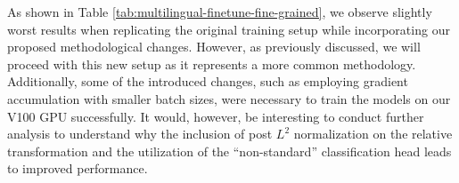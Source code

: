 \documentclass[../main.tex]{subfiles}
\begin{document}
\begin{table}[h]
\centering
{}
\caption{Summary of the original results presented in \cite{moschella_relative_2022} (over five random seeds)}
\label{tab:multilingual-finetune-og}
\end{table}

As shown in Table \ref{tab:multilingual-finetune-fine-grained}, we observe slightly worst results when replicating the original training setup while incorporating our proposed methodological changes. However, as previously discussed, we will proceed with this new setup as it represents a more common methodology. Additionally, some of the introduced changes, such as employing gradient accumulation with smaller batch sizes, were necessary to train the models on our V100 GPU successfully. It would, however, be interesting to conduct further analysis to understand why the inclusion of post $L^2$ normalization on the relative transformation and the utilization of the ``non-standard'' classification head leads to improved performance.
\end{document}
